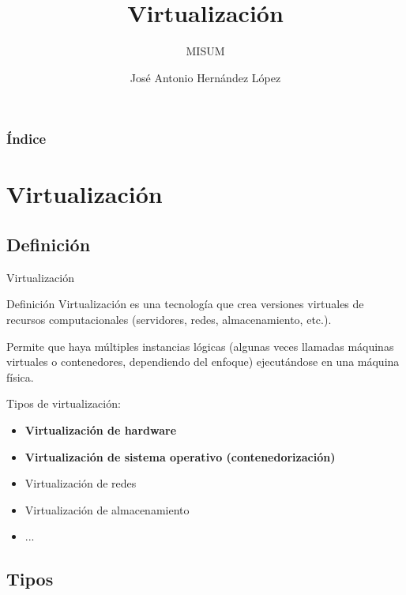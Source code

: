 \documentclass{beamer}
\title[Virtualización] %
{Virtualización}
\subtitle{MISUM}
\author[José A.] %
{José Antonio Hernández López\inst{1}}
\institute[UMU] %
{
  \inst{1}%
  Departamento de Informática y Sistemas\\
  Universidad de Murcia
}
\begin{document}
\frame{\titlepage}

\begin{frame}
\frametitle{Índice}
\tableofcontents
\end{frame}

\section{Virtualización}

\subsection{Definición}

\begin{frame}{Virtualización}


\begin{block}{Definición}
Virtualización es una tecnología que crea versiones virtuales de recursos computacionales (servidores, redes, almacenamiento, etc.). 

Permite que haya múltiples instancias lógicas (algunas veces llamadas máquinas virtuales o contenedores, dependiendo del enfoque) ejecutándose en una máquina física.
\end{block}
\pause
Tipos de virtualización:

\begin{itemize}
    \item \textbf{Virtualización de hardware}
    \item \textbf{Virtualización de sistema operativo (contenedorización)}
    \item Virtualización de redes
    \item Virtualización de almacenamiento
    \item ...
    \end{itemize}

\end{frame}

\subsection{Tipos}
\end{document}
